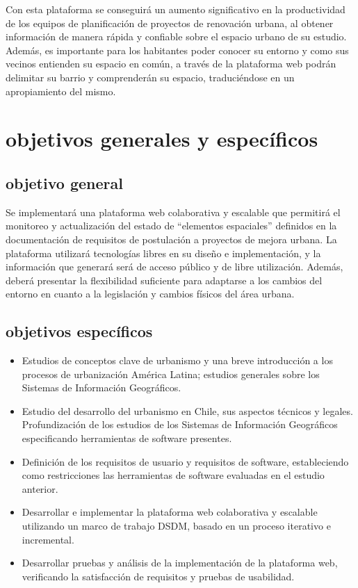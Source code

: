 \documentclass[12pt]{article}
\begin{document}
  Con esta plataforma se conseguirá un aumento significativo en la productividad de los equipos de
  planificación de proyectos de renovación urbana, al obtener información de manera rápida y
  confiable sobre el espacio urbano de su estudio. Además, es importante para los habitantes poder
  conocer su entorno y como sus vecinos entienden su espacio en común, a través de la plataforma web
  podrán delimitar su barrio y comprenderán su espacio, traduciéndose en un apropiamiento del mismo.

\newpage
\section{objetivos generales y específicos}
\subsection{objetivo general}
Se implementará una plataforma web colaborativa y escalable que permitirá el
monitoreo y actualización del estado de ``elementos espaciales'' definidos en
la documentación de requisitos de postulación a proyectos de mejora urbana. La
plataforma utilizará tecnologías libres en su diseño e implementación, y la
información que generará será de acceso público y de libre utilización. Además,
deberá presentar la flexibilidad suficiente para adaptarse a los cambios del
entorno en cuanto a la legislación y cambios físicos del área urbana.

\subsection{objetivos específicos}
\begin{itemize}

	\item Estudios de conceptos clave de urbanismo y una breve introducción a los procesos de
    urbanización América Latina; estudios generales sobre  
    los Sistemas de Información Geográficos.

	\item Estudio del desarrollo del urbanismo en Chile, sus aspectos técnicos y legales.
    Profundización de los estudios de los Sistemas de Información Geográficos especificando
    herramientas de software presentes.

	\item Definición de los requisitos de usuario y
        requisitos de software, estableciendo como restricciones las
        herramientas de software evaluadas en el estudio anterior.

	\item Desarrollar e implementar la plataforma
        web colaborativa y escalable utilizando un marco de trabajo
        DSDM, basado en un proceso iterativo e incremental.

	\item Desarrollar pruebas y análisis de la
        implementación de la plataforma web, verificando la satisfacción
        de requisitos y pruebas de usabilidad.
\end{itemize}
\end{document}
